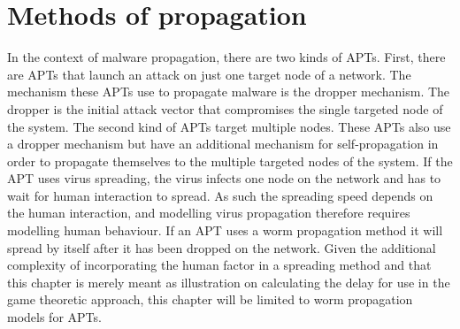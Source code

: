 \section{Methods of propagation}
\label{methodsofpropagation}

In the context of malware propagation, there are two kinds of APTs. First, there are APTs that launch an attack on just one target node of a network. The mechanism these APTs use to propagate malware is the dropper mechanism. The dropper is the initial attack vector that compromises the single targeted node of the system. The second kind of APTs target multiple nodes. These APTs also use a dropper mechanism but have an additional mechanism for self-propagation in order to propagate themselves to the multiple targeted nodes of the system. If the APT uses virus spreading, the virus infects one node on the network and has to wait for human interaction to spread. As such the spreading speed depends on the human interaction, and modelling virus propagation therefore requires modelling human behaviour. If an APT uses a worm propagation method it will spread by itself after it has been dropped on the network. Given the additional complexity of incorporating the human factor in a spreading method and that this chapter is merely meant as illustration on calculating the delay for use in the game theoretic approach, this chapter will be limited to worm propagation models for APTs. \\

